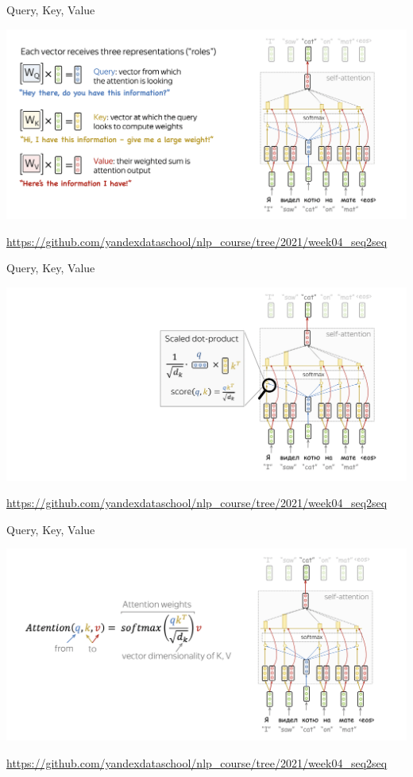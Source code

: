 \documentclass[notes,12pt, aspectratio=169]{beamer}
\begin{document}
\begin{frame}{Query, Key, Value}
	\begin{center}
	\includegraphics[width=.95\linewidth]{qkv1.png}
	\end{center}
	\vfill
	\footnotesize  {\color{blue} \url{https://github.com/yandexdataschool/nlp_course/tree/2021/week04_seq2seq}} 
\end{frame}


\begin{frame}{Query, Key, Value}
	\begin{center}
		\includegraphics[width=.95\linewidth]{qkv2.png}
	\end{center}
	\vfill
	\footnotesize  {\color{blue} \url{https://github.com/yandexdataschool/nlp_course/tree/2021/week04_seq2seq}} 
\end{frame}


\begin{frame}{Query, Key, Value}
	\begin{center}
		\includegraphics[width=.95\linewidth]{qkv3.png}
	\end{center}
	\vfill
	\footnotesize  {\color{blue} \url{https://github.com/yandexdataschool/nlp_course/tree/2021/week04_seq2seq}} 
\end{frame}
\end{document}
